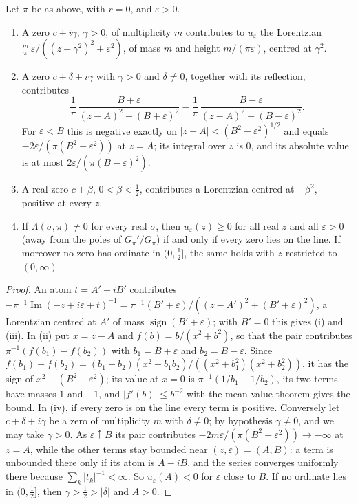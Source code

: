 \begin{proposition}\label{prop:scholzelobe}
Let $\pi$ be as above, with $r=0$, and $\varepsilon>0$.
\begin{enumerate}
\item[(i)] A zero $c+i\gamma$, $\gamma>0$, of multiplicity $m$ contributes to $u_\varepsilon$ the Lorentzian $\frac m\pi\,\varepsilon/((z-\gamma^2)^2+\varepsilon^2)$, of mass $m$ and height $m/(\pi\varepsilon)$, centred at $\gamma^2$.
\item[(ii)] A zero $c+\delta+i\gamma$ with $\gamma>0$ and $\delta\ne0$, together with its reflection, contributes
\[
\frac1\pi\,\frac{B+\varepsilon}{(z-A)^2+(B+\varepsilon)^2}-\frac1\pi\,\frac{B-\varepsilon}{(z-A)^2+(B-\varepsilon)^2}.
\]
For $\varepsilon<B$ this is negative exactly on $|z-A|<(B^2-\varepsilon^2)^{1/2}$ and equals $-2\varepsilon/(\pi(B^2-\varepsilon^2))$ at $z=A$; its integral over $z$ is $0$, and its absolute value is at most $2\varepsilon/(\pi(B-\varepsilon)^2)$.
\item[(iii)] A real zero $c\pm\beta$, $0<\beta<\frac12$, contributes a Lorentzian centred at $-\beta^2$, positive at every $z$.
\item[(iv)] If $\Lambda(\sigma,\pi)\ne0$ for every real $\sigma$, then $u_\varepsilon(z)\ge0$ for all real $z$ and all $\varepsilon>0$ (away from the poles of $G_\pi'/G_\pi$) if and only if every zero lies on the line. If moreover no zero has ordinate in $(0,\frac12]$, the same holds with $z$ restricted to $(0,\infty)$.
\end{enumerate}
\end{proposition}

\begin{proof}
An atom $t=A'+iB'$ contributes $-\pi^{-1}\operatorname{Im}(-z+i\varepsilon+t)^{-1}=\pi^{-1}(B'+\varepsilon)/((z-A')^2+(B'+\varepsilon)^2)$, a Lorentzian centred at $A'$ of mass $\operatorname{sign}(B'+\varepsilon)$; with $B'=0$ this gives (i) and (iii). In (ii) put $x=z-A$ and $f(b)=b/(x^2+b^2)$, so that the pair contributes $\pi^{-1}(f(b_1)-f(b_2))$ with $b_1=B+\varepsilon$ and $b_2=B-\varepsilon$. Since $f(b_1)-f(b_2)=(b_1-b_2)(x^2-b_1b_2)/((x^2+b_1^2)(x^2+b_2^2))$, it has the sign of $x^2-(B^2-\varepsilon^2)$; its value at $x=0$ is $\pi^{-1}(1/b_1-1/b_2)$, its two terms have masses $1$ and $-1$, and $|f'(b)|\le b^{-2}$ with the mean value theorem gives the bound. In (iv), if every zero is on the line every term is positive. Conversely let $c+\delta+i\gamma$ be a zero of multiplicity $m$ with $\delta\ne0$; by hypothesis $\gamma\ne0$, and we may take $\gamma>0$. As $\varepsilon\uparrow B$ its pair contributes $-2m\varepsilon/(\pi(B^2-\varepsilon^2))\to-\infty$ at $z=A$, while the other terms stay bounded near $(z,\varepsilon)=(A,B)$: a term is unbounded there only if its atom is $A-iB$, and the series converges uniformly there because $\sum_k|t_k|^{-1}<\infty$. So $u_\varepsilon(A)<0$ for $\varepsilon$ close to $B$. If no ordinate lies in $(0,\frac12]$, then $\gamma>\frac12>|\delta|$ and $A>0$.
\end{proof}

